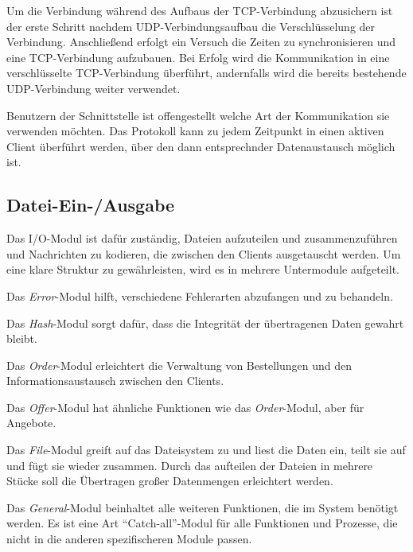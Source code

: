 Um die Verbindung während des Aufbaus der TCP-Verbindung abzusichern ist der erste Schritt nachdem UDP-Verbindungsaufbau die Verschlüsselung der Verbindung. Anschließend erfolgt ein Versuch die Zeiten zu synchronisieren und eine TCP-Verbindung aufzubauen. Bei Erfolg wird die Kommunikation in eine verschlüsselte TCP-Verbindung überführt, andernfalls wird die bereits bestehende UDP-Verbindung weiter verwendet.

Benutzern der Schnittstelle ist offengestellt welche Art der Kommunikation sie verwenden möchten. Das Protokoll kann zu jedem Zeitpunkt in einen aktiven Client überführt werden, über den dann entsprechnder Datenaustausch möglich ist.

\subsection{Datei-Ein-/Ausgabe}
Das I/O-Modul ist dafür zuständig, Dateien aufzuteilen und zusammenzuführen und Nachrichten zu kodieren, die zwischen den Clients ausgetauscht werden. Um eine klare Struktur zu gewährleisten, wird es in mehrere Untermodule aufgeteilt.

Das \textit{Error}-Modul hilft, verschiedene Fehlerarten abzufangen und zu behandeln.

Das \textit{Hash}-Modul sorgt dafür, dass die Integrität der übertragenen Daten gewahrt bleibt.

Das \textit{Order}-Modul erleichtert die Verwaltung von Bestellungen und den Informationsaustausch zwischen den Clients.

Das \textit{Offer}-Modul hat ähnliche Funktionen wie das \textit{Order}-Modul, aber für Angebote.

Das \textit{File}-Modul greift auf das Dateisystem zu und liest die Daten ein, teilt sie auf und fügt sie wieder zusammen. Durch das aufteilen der Dateien in mehrere Stücke soll die Übertragen großer Datenmengen erleichtert werden.

Das \textit{General}-Modul beinhaltet alle weiteren Funktionen, die im System benötigt werden. Es ist eine Art \enquote{Catch-all}-Modul für alle Funktionen und Prozesse, die nicht in die anderen spezifischeren Module passen.
